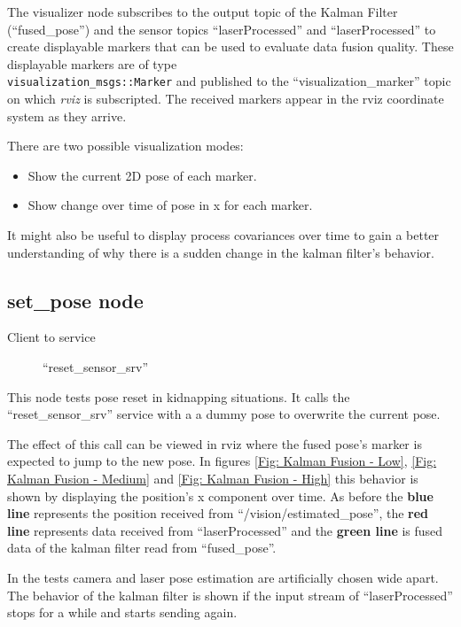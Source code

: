 The visualizer node subscribes to the output topic of the Kalman Filter (``fused\_pose'') and the sensor topics ``laserProcessed'' and ``laserProcessed'' to create displayable markers that can be used to evaluate data fusion quality. These displayable markers are of type \\ \texttt{visualization\_msgs::Marker} and published to the ``visualization\_marker'' topic on which \textit{rviz} is subscripted. The received markers appear in the rviz coordinate system as they arrive.

There are two possible visualization modes:

\begin{itemize}
\item Show the current 2D pose of each marker.
\item Show change over time of pose in x for each marker.
\end{itemize}

It might also be useful to display process covariances over time to gain a better understanding of why there is a sudden change in the kalman filter's behavior.

\subsection{set\_pose node}
\begin{description}
\item[Client to service] ``reset\_sensor\_srv''
\end{description}
This node tests pose reset in kidnapping situations. It calls the ``reset\_sensor\_srv'' service with a a dummy pose to overwrite the current pose.

The effect of this call can be viewed in rviz where the fused pose's marker is expected to jump to the new pose. In figures \ref{Fig: Kalman Fusion - Low}, \ref{Fig: Kalman Fusion - Medium} and \ref{Fig: Kalman Fusion - High} this behavior is shown by displaying the position's x component over time. As before the \textbf{blue line} represents the position received from ``/vision/estimated\_pose'', the \textbf{red line} represents data received from ``laserProcessed'' and the \textbf{green line} is fused data of the kalman filter read from ``fused\_pose''.

In the tests camera and laser pose estimation are artificially chosen wide apart. The behavior of the kalman filter is shown if the input stream of ``laserProcessed'' stops for a while and starts sending again.

